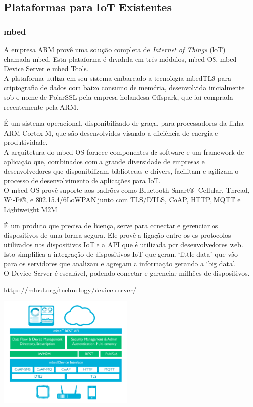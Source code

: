 \subsection{Plataformas para IoT Existentes}
\label{sec:IoTPlataformas}

\subsubsection{mbed}
A empresa ARM provê uma solução completa de \textit{Internet of Things} (IoT) chamada mbed\cite{mbed}.
Esta plataforma é dividida em três módulos, mbed OS, mbed Device Server e mbed Tools.\\
A plataforma utiliza em seu sistema embarcado a tecnologia mbedTLS para criptografia de dados com baixo
consumo de memória, desenvolvida inicialmente sob o nome de PolarSSL pela empresa holandesa Offspark,
que foi comprada recentemente pela ARM.

É um sistema operacional, disponibilizado de graça, para processadores da linha ARM Cortex-M, que são
desenvolvidos visando a eficiência de energia e produtividade.\\
A arquitetura do mbed OS fornece componentes de software e um framework de aplicação que, combinados
com a grande diversidade de empresas e desenvolvedores que disponibilizam bibliotecas e drivers, facilitam
e agilizam o processo de desenvolvimento de aplicações para IoT.\\
O mbed OS provê suporte aos padrões como Bluetooth Smart®, Cellular, Thread, Wi-Fi®, e 802.15.4/6LoWPAN junto
com TLS/DTLS, CoAP, HTTP, MQTT e Lightweight M2M

É um produto que precisa de licença, serve para conectar e gerenciar os dispositivos de uma forma segura.
Ele provê a ligação entre os os protocolos utilizados nos dispositivos IoT e a API que é utilizada por
desenvolvedores web. Isto simplifica a integração de dispositivos IoT que geram \lq little data\rq\ que vão
para os servidores que analizam e agregam a informação gerando a \lq big data\rq.\\
O Device Server é escalável, podendo conectar e gerenciar milhões de dispositivos.

https://mbed.org/technology/device-server/ \\

\begin{center}
\includegraphics[width=0.5\textwidth]{fig/mbed_arch.png}
\end{center}

